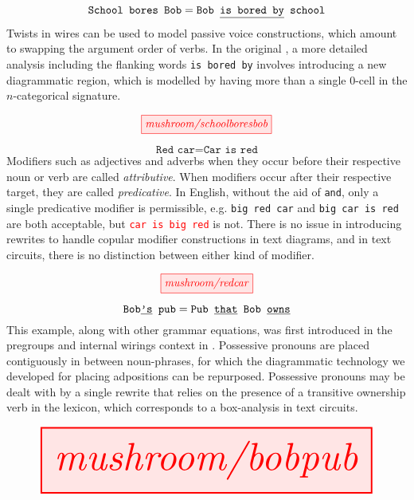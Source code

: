 \begin{myboxB}
\begin{example}\label{ex:pass}
\[\texttt{School bores Bob} = \texttt{Bob \underline{is bored by} school}\]
Twists in wires can be used to model passive voice constructions, which amount to swapping the argument order of verbs. In the original \citep{wang-mascianica_distilling_2023}, a more detailed analysis including the flanking words \texttt{\texttt{is} bored \texttt{by}} involves introducing a new diagrammatic region, which is modelled by having more than a single 0-cell in the $n$-categorical signature.
\end{example}
\[\tikzfig{mushroom/schoolboresbob}\]
\end{myboxB}

\begin{myboxB}
\begin{example}\label{ex:copula}
\[\texttt{Red car} = \texttt{Car is red}\]
Modifiers such as adjectives and adverbs when they occur before their respective noun or verb are called \emph{attributive}. When modifiers occur after their respective target, they are called \emph{predicative}. In English, without the aid of \texttt{and}, only a single predicative modifier is permissible, e.g. \texttt{big red car} and \texttt{big car is red} are both acceptable, but \textcolor{red}{\texttt{car is big red}} is not. There is no issue in introducing rewrites to handle copular modifier constructions in text diagrams, and in text circuits, there is no distinction between either kind of modifier.
\end{example}
\[\tikzfig{mushroom/redcar}\]
\end{myboxB}

\begin{myboxB}
\begin{example}\label{ex:posspron}
\[\texttt{Bob\underline{'s} pub} = \texttt{Pub \underline{that} Bob \underline{owns}}\]
This example, along with other grammar equations, was first introduced in the pregroups and internal wirings context in \citep{coecke_grammar_2021}. Possessive pronouns are placed contiguously in between noun-phrases, for which the diagrammatic technology we developed for placing adpositions can be repurposed. Possessive pronouns may be dealt with by a single rewrite that relies on the presence of a transitive ownership verb in the lexicon, which corresponds to a box-analysis in text circuits.
\end{example}
\[\resizebox{\textwidth}{!}{\tikzfig{mushroom/bobpub}}\]
\end{myboxB}

